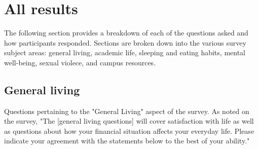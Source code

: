 \documentclass{article}\usepackage[]{graphicx}\usepackage[]{color}
\begin{document}
\pagebreak
\section{All results}
The following section provides a breakdown of each of the questions asked and how participants responded. Sections are broken down into the various survey subject areas: general living, academic life, sleeping and eating habits, mental well-being, sexual violece, and campus resources.



\subsection{General living}
Questions pertaining to the "General Living" aspect of the survey. As noted on the survey, "The  [general living questions] will cover satisfaction with life as well as questions about how your financial situation affects your everyday life.  Please indicate your agreement with the statements below to the best of your ability."
\end{document}
